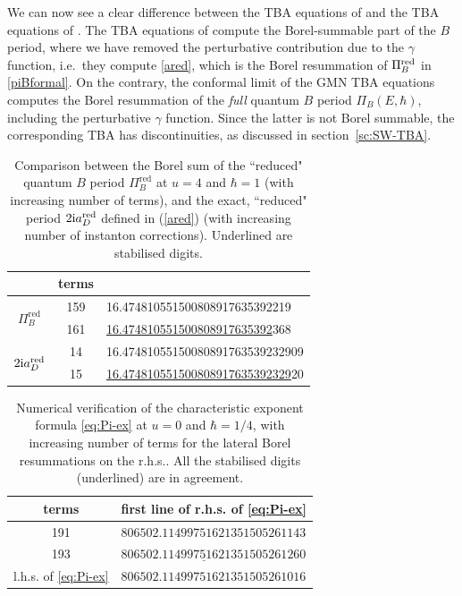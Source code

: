 \documentclass[a4paper,11pt]{article}
\theoremstyle{definition}
\newcommand{\ri}{{\rm i}}
\begin{document}
We can now see a clear difference between the TBA equations of
\cite{ns} and the TBA equations of \cite{gmn}. The TBA equations of
\cite{ns} compute the Borel-summable part of the $B$ period, where we
have removed the perturbative contribution due to the $\gamma$
function, i.e.~they compute \eqref{ared}, which is the Borel
resummation of $\Pi_B^{\rm red}$ in \eqref{piBformal}.  On the
contrary, the conformal limit of the GMN TBA equations computes the
Borel resummation of the {\it full} quantum $B$ period $\Pi_B(E,\hbar)$,
including the perturbative $\gamma$ function. Since the latter is not
Borel summable, the corresponding TBA has discontinuities, as discussed in
section~\ref{sc:SW-TBA}.

\begin{table}
  \centering
  \begin{tabular}{ccl}\toprule
    & terms & \\\midrule
    \multirow{2}{*}{$\Pi^{\text{red}}_B$}
    &159 & 16.474810551500808917635392219 \\
    &161 & \underline{16.474810551500808917635392}368 \\\midrule
    \multirow{2}{*}{$2\ri a_D^{\text{red}}$}
    &14 & 16.47481055150080891763539232909\\
    &15 & \underline{16.474810551500808917635392329}20 \\\bottomrule
  \end{tabular}
  \caption{Comparison between the Borel sum of the ``reduced" quantum $B$ period
    $\Pi^{\text{red}}_B$ at $u=4$ and $\hbar=1$ (with
    increasing number of terms), and the exact, ``reduced" period
    $2\ri a_D^{\text{red}}$ defined in (\ref{ared}) (with
    increasing number of instanton corrections). Underlined are
    stabilised digits.}
  \label{tb:BorelSum-B}
\end{table}

\begin{table}
  \centering
  \begin{tabular}{cl}\toprule
    terms & first line of r.h.s. of \eqref{eq:Pi-ex}\\\midrule
    191 & $806502.11499751621351505261143$\\
    193 & $\underline{806502.11499751621351505261}260$ \\\midrule
    l.h.s. of \eqref{eq:Pi-ex}
          & $806502.11499751621351505261016$\\
    \bottomrule                  
  \end{tabular}
  \caption{Numerical verification of the characteristic exponent
    formula \eqref{eq:Pi-ex} at $u=0$ and $\hbar=1/4$, 
    with increasing number of terms for the lateral Borel
    resummations on the r.h.s.. All the stabilised digits (underlined)
    are in agreement.}
  \label{tb:Pi-ex}
\end{table}
\end{document}
